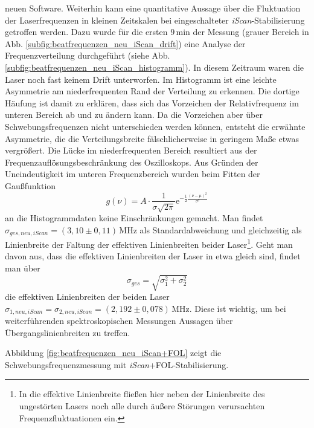 neuen Software. Weiterhin kann eine quantitative Aussage über die Fluktuation
der Laserfrequenzen in kleinen Zeitskalen bei eingeschalteter
\textit{iScan}-Stabilisierung getroffen werden. Dazu wurde für die ersten
$9\,$min der Messung (grauer Bereich in Abb.
\ref{subfig:beatfrequenzen_neu_iScan_drift}) eine Analyse der Frequenzverteilung
durchgeführt (siehe Abb. \ref{subfig:beatfrequenzen_neu_iScan_histogramm}).
In diesem Zeitraum waren die Laser noch fast keinem Drift unterworfen. Im
Histogramm ist eine leichte Asymmetrie am niederfrequenten Rand der Verteilung
zu erkennen. Die dortige Häufung ist damit zu erklären, dass sich das Vorzeichen
der Relativfrequenz im unteren Bereich ab und zu ändern kann. Da die Vorzeichen
aber über Schwebungsfrequenzen nicht unterschieden werden können, entsteht die erwähnte
Asymmetrie, die die Verteilungsbreite fälschlicherweise in geringem Maße etwas
vergrößert. Die Lücke im niederfrequenten Bereich resultiert aus der
Frequenzauflösungsbeschränkung des Oszilloskops. Aus Gründen der Uneindeutigkeit
im unteren Frequenzbereich wurden beim Fitten der Gaußfunktion
\begin{equation}\label{eq:schwebungsfrequenzen_gauss}
	g(\nu)=A\cdot\frac{1}{\sigma\sqrt{2\pi}}\mathrm{e}^{-\frac{1}{2}\frac{(\nu-\mu)^2}{\sigma^2}}
\end{equation}
an die Histogrammdaten keine Einschränkungen gemacht. Man findet
$\sigma_{ges,neu,iScan}=(3,10\pm0,11)\,$MHz als Standardabweichung und
gleichzeitig als Linienbreite der Faltung der effektiven Linienbreiten beider
Laser\footnote{In die effektive Linienbreite fließen hier neben der Linienbreite
des ungestörten Lasers noch alle durch äußere Störungen verursachten
Frequenzfluktuationen ein.}. Geht man davon aus, dass die effektiven
Linienbreiten der Laser in etwa gleich sind, findet man über
\begin{equation}\label{eq:schwebungsfrequenzen_linienbreite}
	\sigma_{ges}=\sqrt{\sigma_1^2+\sigma_2^2}
\end{equation}
die effektiven Linienbreiten der beiden Laser
$\sigma_{1,neu,iScan}=\sigma_{2,neu,iScan}=(2,192\pm0,078)\,$MHz. Diese ist
wichtig, um bei weiterführenden spektroskopischen Messungen Aussagen über
Übergangslinienbreiten zu treffen.\par
Abbildung \ref{fig:beatfrequenzen_neu_iScan+FOL} zeigt die
Schwebungsfrequenzmessung mit \textit{iScan}+FOL-Stabilisierung.

